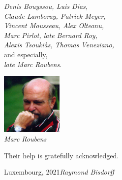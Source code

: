 \vspace{0.5cm}
\begin{minipage}{7cm}
\emph{Denis Bouyssou, Luis Dias,}\\ 
\emph{Claude Lamboray, Patrick Meyer,}\\
\emph{Vincent Mousseau, Alex Olteanu,}\\
\emph{Marc Pirlot, late Bernard Roy,}\\
\emph{Alexis Tsouki\`as, Thomas Veneziano,}\\
and especially,\\
\emph{late Marc Roubens}.
\end{minipage}\quad
\begin{minipage}{3cm}
\includegraphics[width=3cm]{Figures/Marc-Roubens.jpg} \\
{\tiny \emph{Marc Roubens}}
\end{minipage}

\vspace{0.3cm}
Their help is gratefully acknowledged.

\vspace{\baselineskip}
\begin{flushright}\noindent
Luxembourg, 2021\hfill {\it Raymond Bisdorff}\\
\end{flushright}


